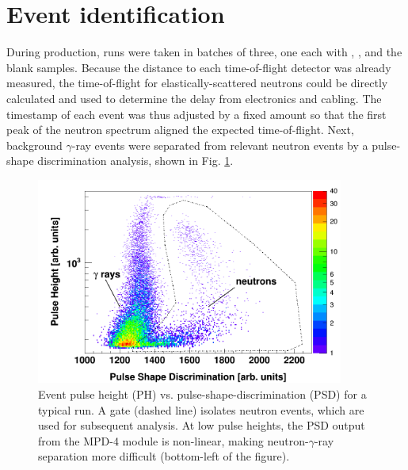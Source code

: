 \section{Event identification}
During production, runs were taken in batches of three, one each with \snTwelve,
\snFour, and the blank samples. Because the distance to each time-of-flight detector
was already measured, the time-of-flight for elastically-scattered neutrons could
be directly calculated and used to determine the delay from electronics and cabling.
The timestamp of each event was thus adjusted by a fixed amount
so that the first peak of the neutron spectrum aligned the expected
time-of-flight. Next, background $\gamma$-ray events were separated from relevant
neutron events by a pulse-shape discrimination analysis, shown in Fig. \ref{PHPSDPlot}.

\begin{figure}[ht!]
    \centering
    \includegraphics[width=0.9\textwidth]{figures/PHPSDPlot.png}
    \caption[Event pulse height (PH) vs. pulse-shape-discrimination (PSD) for
    a typical run]
    {
        Event pulse height (PH) vs. pulse-shape-discrimination (PSD) for
        a typical run. A gate (dashed line) isolates neutron events, which are
        used for subsequent analysis. At low pulse heights, the PSD output from the
        MPD-4 module is non-linear, making neutron-$\gamma$-ray separation more difficult
        (bottom-left of the figure).
    }
    \label{PHPSDPlot}
\end{figure}

